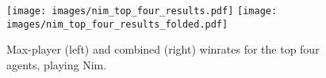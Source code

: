 \begin{figure}[H]
    \centering
    \texttt{[image: images/nim\_top\_four\_results.pdf]}
    \texttt{[image: images/nim\_top\_four\_results\_folded.pdf]}
    \caption{Max-player (left) and combined (right) winrates for the top four agents, playing Nim.}
    \label{fig:nim_top_four_results}
\end{figure}

